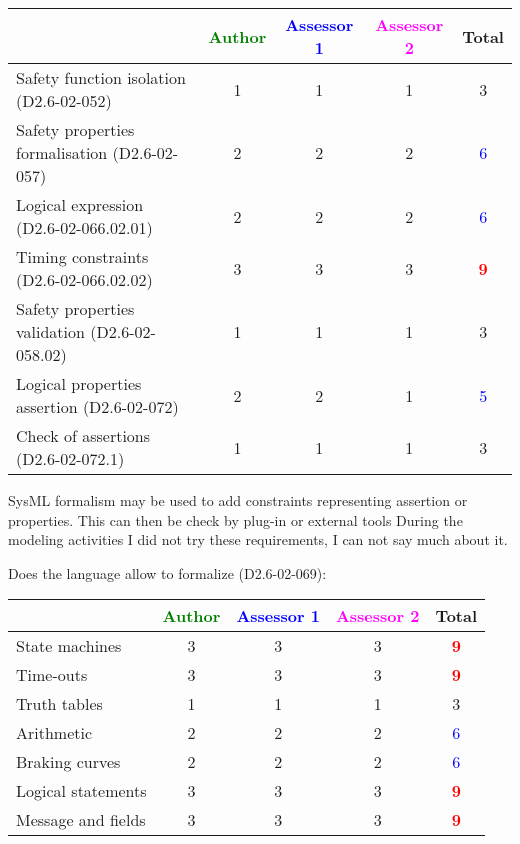 \begin{tabular}{|l | c | c | c | c|}
\hline
& \textcolor{green}{Author} & \textcolor{blue}{Assessor 1} & \textcolor{magenta}{Assessor 2} & Total \\
\hline 
Safety function isolation (D2.6-02-052)  & 1    & 1    & 1     & 3     \\
\hline 
Safety properties formalisation (D2.6-02-057)  &2 & 2    & 2      & \textcolor{blue}{6} \\
\hline
Logical expression (D2.6-02-066.02.01)  &2 & 2    & 2    & \textcolor{blue}{6} \\
\hline
Timing constraints (D2.6-02-066.02.02)  &3 & 3     & 3    & \textcolor{red}{\textbf{9}} \\
\hline
Safety properties validation (D2.6-02-058.02)  &1 & 1    & 1    & 3     \\
\hline
Logical properties assertion (D2.6-02-072)  &2 & 2    & 1     & \textcolor{blue}{5} \\
\hline
Check  of assertions (D2.6-02-072.1)  &1 & 1    & 1     & 3      \\
\hline
\end{tabular}
\begin{author_comment}
SysML formalism may be used to add constraints representing assertion
or properties. This can then be check by plug-in or external tools
During the modeling activities I did not try these requirements, I can
not say much about it.
\end{author_comment}
Does the language allow to  formalize (D2.6-02-069):

\begin{tabular}{|l | c | c | c | c|}
\hline
& \textcolor{green}{Author} & \textcolor{blue}{Assessor 1} & \textcolor{magenta}{Assessor 2} & Total \\
\hline 
State machines  &3 & 3    & 3    & \textcolor{red}{\textbf{9}} \\
\hline
Time-outs  &3 & 3    & 3    & \textcolor{red}{\textbf{9}} \\
\hline
Truth tables  &1 &1 & 1    & 3      \\
\hline
Arithmetic  &2 & 2    & 2    & \textcolor{blue}{6} \\
\hline
Braking curves  &2 & 2    & 2    & \textcolor{blue}{6}  \\
\hline
Logical statements &3 & 3    & 3    & \textcolor{red}{\textbf{9}}  \\
\hline
Message and fields &3 & 3    &3 & \textcolor{red}{\textbf{9}}  \\
\hline
\end{tabular}

